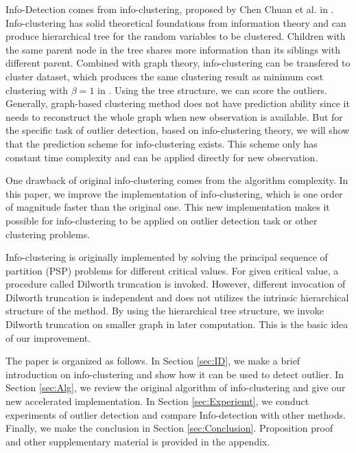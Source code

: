 \documentclass[runningheads]{llncs}
\begin{document}
Info-Detection comes from info-clustering, proposed by Chen Chuan et al. in \cite{RN1}. Info-clustering has solid theoretical foundations from information theory and can produce hierarchical tree for the random variables to be clustered. Children with the same parent node in the tree shares more information than its siblings with different parent. Combined with graph theory, info-clustering can be transfered to cluster dataset, which produces the same clustering result as minimum cost clustering with $\beta = 1$ in \cite{RN7}.  Using the tree structure, we can score the outliers. Generally, graph-based clustering method does not have prediction ability since it needs to reconstruct the whole graph when new observation is available. But for the specific task of outlier detection, based on info-clustering theory, we will show that the prediction scheme for info-clustering exists. This scheme only has constant time complexity and can be applied directly for new observation.

One drawback of original info-clustering comes from the algorithm complexity. In this paper, we improve the implementation of info-clustering, which is one order of magnitude faster than the original one. This new implementation makes it possible for info-clustering to be applied on outlier detection task or other clustering problems.

Info-clustering is originally implemented by solving the principal sequence of partition (PSP) problems for different critical values. For given critical value, a procedure called Dilworth truncation is invoked. However, different invocation of Dilworth truncation is independent and does not utilizes the intrinsic hierarchical structure of the method. By using the hierarchical tree structure, we invoke Dilworth truncation on smaller graph in later computation. This is the basic idea of our improvement. 

The paper is organized as follows. In Section \ref{sec:ID}, we make a brief introduction on info-clustering and show how it can be used to detect outlier. In Section \ref{sec:Alg}, we review the original algorithm of info-clustering and give our new accelerated implementation. In Section \ref{sec:Experiemt}, we conduct experiments of outlier detection and compare Info-detection with other methods. Finally, we make the conclusion in Section \ref{sec:Conclusion}. Proposition proof and other supplementary material is provided in the appendix.
\end{document}

